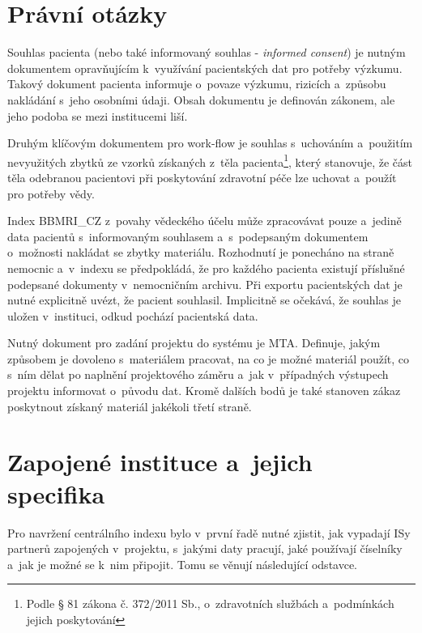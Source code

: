 \documentclass[11pt, draft, oneside]{fithesis2}
\newcommand{\ProjectName}{\mbox{BBMRI\_CZ}\xspace}
\begin{document}
\section{Právní otázky}\label{chapter:analysis:section:legal}
Souhlas pacienta (nebo také informovaný souhlas - \textit{informed consent}) je nutným dokumentem opravňujícím k~využívání pacientských dat pro potřeby výzkumu. Takový dokument pacienta informuje o~povaze výzkumu, rizicích a~způsobu nakládání s~jeho osobními údaji. Obsah dokumentu je definován zákonem, ale jeho podoba se mezi institucemi liší. 

Druhým klíčovým dokumentem pro work-flow je souhlas s~uchováním a~použitím nevyužitých zbytků ze vzorků získaných z~těla pacienta\footnote{Podle § 81 zákona č. 372/2011 Sb., o~zdravotních službách a~podmínkách jejich poskytování}, který stanovuje, že část těla odebranou pacientovi při poskytování zdravotní péče lze uchovat a~použít pro potřeby vědy. 

Index \ProjectName z~povahy vědeckého účelu může zpracovávat pouze a~jedině data pacientů s~informovaným souhlasem a~s~podepsaným dokumentem o~možnosti nakládat se zbytky materiálu. Rozhodnutí je ponecháno na straně nemocnic a~v~indexu se předpokládá, že pro každého pacienta existují příslušné podepsané dokumenty v~nemocničním archivu.
Při exportu pacientských dat je nutné explicitně uvézt, že pacient souhlasil. Implicitně se očekává, že souhlas je uložen v~instituci, odkud pochází pacientská data.

Nutný dokument pro zadání projektu do systému je MTA. Definuje, jakým způsobem je dovoleno s~materiálem pracovat, na co je možné materiál použít, co s~ním dělat po naplnění projektového záměru a~jak v~případných výstupech projektu informovat o~původu dat. Kromě dalších bodů je také stanoven zákaz poskytnout získaný materiál jakékoli třetí straně.


\section{Zapojené instituce a~jejich specifika}\label{sec:instituce}
Pro navržení centrálního indexu bylo v~první řadě nutné zjistit, jak vypadají ISy partnerů zapojených v~projektu, s~jakými daty pracují, jaké používají číselníky a~jak je možné se k~nim připojit. Tomu se věnují následující odstavce.
\end{document}
